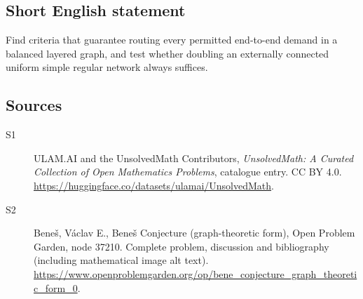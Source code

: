 \documentclass[11pt]{book}
\begin{document}
\subsection{Short English statement}
Find criteria that guarantee routing every permitted end-to-end demand in a balanced layered graph, and test whether doubling an externally connected uniform simple regular network always suffices.
\subsection{Sources}
\begin{description}
\item[\hypertarget{source:statement:1}{S1}] ULAM.AI and the UnsolvedMath Contributors, \emph{UnsolvedMath: A Curated Collection of Open Mathematics Problems}, catalogue entry. CC BY 4.0. \url{https://huggingface.co/datasets/ulamai/UnsolvedMath}.
\item[\hypertarget{source:statement:2}{S2}] Beneš, Václav E., Beneš Conjecture (graph-theoretic form), Open Problem Garden, node 37210. Complete problem, discussion and bibliography (including mathematical image alt text). \url{https://www.openproblemgarden.org/op/bene_conjecture_graph_theoretic_form_0}.
\end{description}
\label{end:statement}
\end{document}
